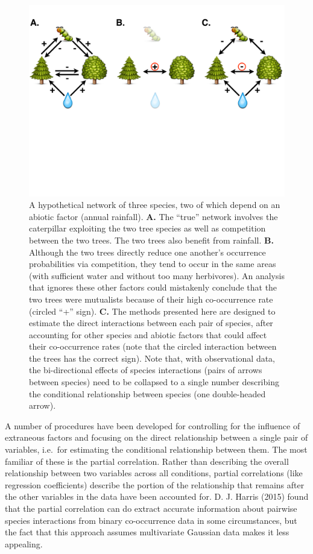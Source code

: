 \begin{figure}[htbp]
\centering
\includegraphics{figure-1.pdf}
\caption{A hypothetical network of three species, two of which depend on
an abiotic factor (annual rainfall). \textbf{A.} The ``true'' network
involves the caterpillar exploiting the two tree species as well as
competition between the two trees. The two trees also benefit from
rainfall. \textbf{B.} Although the two trees directly reduce one
another's occurrence probabilities via competition, they tend to occur
in the same areas (with sufficient water and without too many
herbivores). An analysis that ignores these other factors could
mistakenly conclude that the two trees were mutualists because of their
high co-occurrence rate (circled ``+'' sign). \textbf{C.} The methods
presented here are designed to estimate the direct interactions between
each pair of species, after accounting for other species and abiotic
factors that could affect their co-occurrence rates (note that the
circled interaction between the trees has the correct sign). Note that,
with observational data, the bi-directional effects of species
interactions (pairs of arrows between species) need to be collapsed to a
single number describing the conditional relationship between species
(one double-headed arrow).}
\end{figure}

A number of procedures have been developed for controlling for the
influence of extraneous factors and focusing on the direct relationship
between a single pair of variables, i.e.~for estimating the conditional
relationship between them. The most familiar of these is the partial
correlation. Rather than describing the overall relationship between two
variables across all conditions, partial correlations (like regression
coefficients) describe the portion of the relationship that remains
after the other variables in the data have been accounted for. D. J.
Harris (2015) found that the partial correlation can do extract accurate
information about pairwise species interactions from binary
co-occurrence data in some circumstances, but the fact that this
approach assumes multivariate Gaussian data makes it less appealing.

